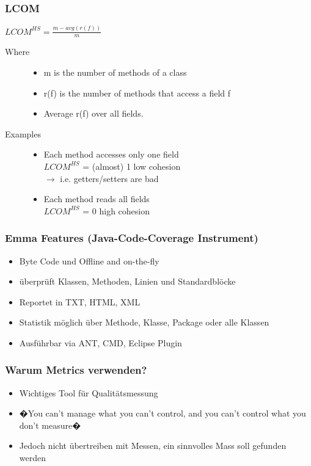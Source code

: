 \documentclass[a4paper,10pt]{article}
\newcommand{\ra}{\rightarrow}
\begin{document}
\subsubsection{LCOM}
$LCOM^{HS} = \frac{m-avg(r(f))}{m}$
\begin{description}
	\item[Where] \hfill
		\begin{itemize}
			\item m is the number of methods of a class
			\item r(f) is the number of methods that access a field f
			\item Average r(f) over all fields.
		\end{itemize}
	\item[Examples] \hfill
		\begin{itemize}
			\item Each method accesses only one field \\
				$LCOM^{HS}$ = (almost) 1 low cohesion \\
				$\ra$ i.e. getters/setters are bad
			\item Each method reads all fields \\
				$LCOM^{HS}$ = 0 high cohesion
		\end{itemize}
\end{description}

\subsubsection{Emma Features (Java-Code-Coverage Instrument)}
\begin{itemize}
\item Byte Code und Offline and on-the-fly
\item \"{u}berpr\"{u}ft Klassen, Methoden, Linien und Standardbl\"{o}cke
\item Reportet in TXT, HTML, XML
\item Statistik m\"{o}glich \"{u}ber Methode, Klasse, Package oder alle Klassen
\item Ausf\"{u}hrbar via ANT, CMD, Eclipse Plugin
\end{itemize}

\subsubsection{Warum Metrics verwenden?}
\begin{itemize}
\item Wichtiges Tool f\"{u}r Qualit\"{a}tsmessung
\item �You can't manage what you can't control, and you can't control what you don't measure�
\item Jedoch nicht \"{u}bertreiben mit Messen, ein sinnvolles Mass soll gefunden werden
\end{itemize}
\end{document}
